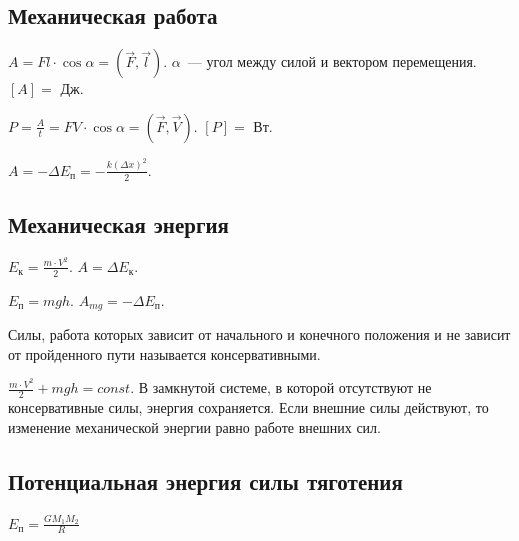 \documentclass[12pt]{article}
\begin{document}
	\subsection{Механическая работа}
	\begin{definition}
		$A = Fl \cdot \cos \alpha = (\vec{F}, \vec{l})$. $\alpha$~--- угол между силой и вектором перемещения. $[A] =$ Дж.
	\end{definition}
	\begin{definition}[Мощность]
		$P = \frac{A}{t} = FV \cdot \cos \alpha = (\vec{F}, \vec{V})$. $[P] =$ Вт.
	\end{definition}
	\begin{definition}
		$A = -\varDelta E_{\text{п}} = -\frac{k (\varDelta x)^2}{2}$.
	\end{definition}
	\subsection{Механическая энергия}
	\begin{definition}
		$E_{\text{к}} = \frac{m \cdot V^2}{2}$. $A = \varDelta E_{\text{к}}$.
	\end{definition}
	\begin{definition}
		$E_{\text{п}} = mgh$. $A_{mg} = - \varDelta E_{\text{п}}$.
	\end{definition}
	\begin{definition}
		Силы, работа которых зависит от начального и конечного положения и не зависит от пройденного пути называется консервативными.
	\end{definition}
	\begin{definition}
		$\frac{m \cdot V^2}{2} + mgh = const$. В замкнутой системе, в которой отсутствуют не консервативные силы, энергия сохраняется. Если внешние силы действуют, то изменение механической энергии равно работе внешних сил.
	\end{definition}
	\subsection{Потенциальная энергия силы тяготения}
	$E_{\text{п}} = \frac{GM_1M_2}{R}$
\end{document}
